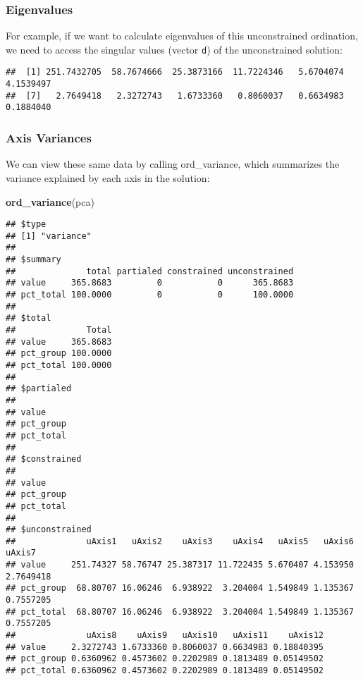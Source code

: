 \documentclass[
]{article}
\newenvironment{Shaded}{\begin{snugshade}}{\end{snugshade}}
\newcommand{\DecValTok}[1]{\textcolor[rgb]{0.00,0.00,0.81}{#1}}
\newcommand{\KeywordTok}[1]{\textcolor[rgb]{0.13,0.29,0.53}{\textbf{#1}}}
\newcommand{\NormalTok}[1]{#1}
\newcommand{\OperatorTok}[1]{\textcolor[rgb]{0.81,0.36,0.00}{\textbf{#1}}}
\begin{document}
\hypertarget{eigenvalues}{%
\subsubsection{Eigenvalues}\label{eigenvalues}}

For example, if we want to calculate eigenvalues of this unconstrained
ordination, we need to access the singular values (vector \texttt{d}) of
the unconstrained solution:

\begin{Shaded}
\end{Shaded}

\begin{verbatim}
##  [1] 251.7432705  58.7674666  25.3873166  11.7224346   5.6704074   4.1539497
##  [7]   2.7649418   2.3272743   1.6733360   0.8060037   0.6634983   0.1884040
\end{verbatim}

\hypertarget{axis-variances}{%
\subsubsection{Axis Variances}\label{axis-variances}}

We can view these same data by calling ord\_variance, which summarizes
the variance explained by each axis in the solution:

\begin{Shaded}
\begin{Highlighting}[]
\KeywordTok{ord_variance}\NormalTok{(pca)}
\end{Highlighting}
\end{Shaded}

\begin{verbatim}
## $type
## [1] "variance"
## 
## $summary
##              total partialed constrained unconstrained
## value     365.8683         0           0      365.8683
## pct_total 100.0000         0           0      100.0000
## 
## $total
##              Total
## value     365.8683
## pct_group 100.0000
## pct_total 100.0000
## 
## $partialed
##          
## value    
## pct_group
## pct_total
## 
## $constrained
##          
## value    
## pct_group
## pct_total
## 
## $unconstrained
##              uAxis1   uAxis2    uAxis3    uAxis4   uAxis5   uAxis6    uAxis7
## value     251.74327 58.76747 25.387317 11.722435 5.670407 4.153950 2.7649418
## pct_group  68.80707 16.06246  6.938922  3.204004 1.549849 1.135367 0.7557205
## pct_total  68.80707 16.06246  6.938922  3.204004 1.549849 1.135367 0.7557205
##              uAxis8    uAxis9   uAxis10   uAxis11    uAxis12
## value     2.3272743 1.6733360 0.8060037 0.6634983 0.18840395
## pct_group 0.6360962 0.4573602 0.2202989 0.1813489 0.05149502
## pct_total 0.6360962 0.4573602 0.2202989 0.1813489 0.05149502
\end{verbatim}
\end{document}

